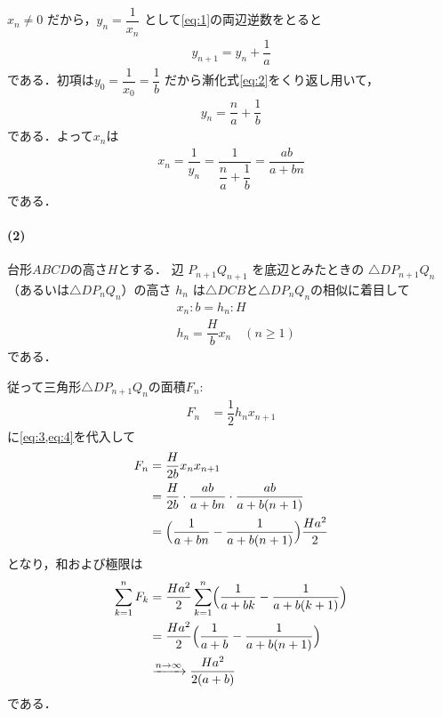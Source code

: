 \documentclass[../../main.tex]{subfiles}
\begin{document}
$x_n \neq 0$ だから，$y_n = \dfrac{1}{x_n}$ として\cref{eq:1}の両辺逆数をとると
\begin{align}
  y_{n+1} = y_n + \dfrac{1}{a} \label{eq:2}
\end{align}
である．初項は$y_0 = \dfrac{1}{x_0} = \dfrac{1}{b}$ だから漸化式\cref{eq:2}をくり返し用いて，
\begin{align}
  y_n = \dfrac{n}{a} + \dfrac{1}{b}
\end{align}
である．よって$x_n$は
\begin{align}
  x_n
  = \dfrac{1}{y_n}
  = \dfrac{1}{\dfrac{n}{a} + \dfrac{1}{b}} = \dfrac{ab}{a + bn} \label{eq:3}
\end{align}
である．

\paragraph{(2)}

台形$ABCD$の高さ$H$とする．
辺 $P_{n+1} Q_{n+1}$ を底辺とみたときの $\triangle D P_{n+1} Q_n$ （あるいは$\triangle D P_n Q_n$）の高さ $h_n$ は$\triangle DCB$と$\triangle D P_nQ_n$の相似に着目して
\begin{align}
  & x_n: b = h_n: H \\
  & h_n = \dfrac{H}{b} x_n \quad (n \ge 1) \label{eq:4}
\end{align}
である．

従って三角形$\triangle D P_{n+1} Q_n$の面積$F_n$:
\begin{align}
  F_n &= \dfrac{1}{2} h_n x_{n+1}
\end{align}
に\cref{eq:3,eq:4}を代入して
\begin{align}
  F_n
  &= \dfrac{H}{2b} x_n x_{n+1}\\
  &= \dfrac{H}{2b} \cdot \dfrac{ab}{a+bn} \cdot \dfrac{ab}{a+b(n+1)} \\
  &= \Bigl( \dfrac{1}{a+bn} - \dfrac{1}{a+b(n+1)} \Bigr) \dfrac{H a^2}{2}
\end{align}
となり，和および極限は
\begin{align}
  \sum_{k=1}^n F_k
  &= \dfrac{Ha^2}{2} \sum_{k=1}^{n} \Bigl( \dfrac{1}{a+bk} - \dfrac{1}{a+b(k+1)} \Bigr) \\
  &= \dfrac{Ha^2}{2} \Bigl( \dfrac{1}{a+b} - \dfrac{1}{a+b(n+1)} \Bigr) \\
  &\xrightarrow{n \to \infty} \dfrac{H a^2}{2(a+b)}
\end{align}
である．

\newpage
\end{document}

